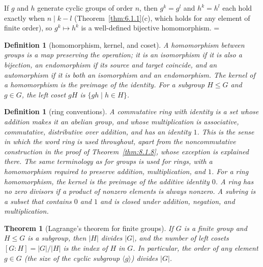 \documentclass[11pt]{article}
\makeatletter
\let\nt@closedisplay\]
\def\nt@guardedclose{\@ifnextchar\par{\nt@closeafterpar}{\@ifnextchar\end{\postdisplaypenalty\@M\nt@closedisplay}{\nt@closedisplay}}}
\def\nt@closeafterpar\par{\@ifnextchar\par{\nt@closeafterpar}{\@ifnextchar\end{\postdisplaypenalty\@M\nt@closedisplay\par}{\nt@closedisplay\par}}}
\renewenvironment{proof}[1][\proofname]{\par
  \pushQED{\qed}\normalfont\topsep\medskipamount\edef\nt@afterproof{\@endparpenalty=\the\@endparpenalty\relax}\@beginparpenalty\@M\@endparpenalty\@M\let\]\nt@guardedclose\trivlist\item[]\textit{#1\@addpunct{.}} \ignorespaces}{\ifvmode\addpenalty\@M\fi\popQED\nt@afterproof\endtrivlist\@endpefalse}
\theoremstyle{ntstyle}
\newtheorem{theorem}{Theorem}[subsection]
\newtheorem{definition}{Definition}[subsection]
\newtheorem*{definition*}{Definition}
\makeatother
\begin{document}
\begin{proof} If $g$ and $h$ generate cyclic
  groups of order $n$, then $g^k=g^l$ and $h^k=h^l$ each hold exactly when
  $n\mid k-l$ (Theorem~\ref{thm:6.1.1}(c), which holds for any element of finite
  order), so $g^k\mapsto h^k$ is a well-defined bijective homomorphism.
\end{proof}

\begin{definition}[homomorphism, kernel, and coset]\label{def:6.6.4}\label{def:homomorphism-kernel-and-coset}
  A homomorphism between groups is a map preserving the operation; it is
  an isomorphism if it is also a bijection, an endomorphism if its source and target coincide, and an automorphism
  if it is both an isomorphism and an endomorphism. The kernel of a
  homomorphism is the preimage of the identity. For a subgroup $H\le G$
  and $g\in G$, the left coset $gH$ is $\{gh\mid h\in H\}$.

\end{definition}

\begin{definition*}[ring conventions]\label{def:rings}
  A commutative ring with identity is a set whose addition makes it an
  abelian group, and whose multiplication is associative, commutative,
  distributive over addition, and has an identity $1$.
  This is the sense in which the word ring is used throughout, apart from
  the noncommutative construction in the proof of Theorem~\ref{thm:8.1.8},
  whose exception is explained there.
  The same terminology as for groups is used for rings, with a
  homomorphism required
  to preserve addition, multiplication, and $1$. For a ring homomorphism, the kernel is the preimage
  of the additive identity $0$. A ring has no zero divisors if a product
  of nonzero elements is always nonzero. A subring is a subset that
  contains $0$ and $1$ and is closed under addition, negation, and
  multiplication.

\end{definition*}

\begin{theorem}[Lagrange's theorem for finite groups]\label{thm:6.6.2}\label{thm:lagrange-theorem-for-finite-groups}
  If $G$ is a
  finite group and $H \le G$ is a subgroup, then $|H|$ divides $|G|$, and
  the number of left cosets $[G:H] = |G|/|H|$ is the index of $H$ in
  $G$. In particular, the order of any element $g \in G$ (the size of
  the cyclic subgroup $\langle g\rangle$) divides $|G|$.

\end{theorem}
\end{document}
